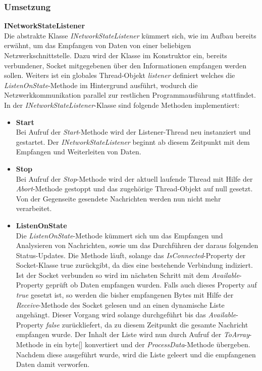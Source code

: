 \subsubsection{Umsetzung}
\textbf{INetworkStateListener}\\
Die abstrakte Klasse \textit{INetworkStateListener} kümmert sich, wie im Aufbau bereits erwähnt, um das Empfangen von Daten von einer beliebigen Netzwerkschnittstelle. Dazu wird der Klasse im Konstruktor ein, bereits verbundener, Socket mitgegebenen über den Informationen empfangen werden sollen. Weiters ist ein globales Thread-Objekt \textit{listener} definiert welches die \textit{ListenOnState}-Methode im Hintergrund ausführt, wodurch die Netzwerkkommunikation parallel zur restlichen Programmausführung stattfindet.\\
In der \textit{INetworkStateListener}-Klasse sind folgende Methoden implementiert:
\begin{itemize}
\item \textbf{Start}\\
Bei Aufruf der \textit{Start}-Methode wird der Listener-Thread neu instanziert und gestartet. Der  \textit{INetworkStateListener} beginnt ab diesem Zeitpunkt mit dem Empfangen und Weiterleiten von Daten. 
\item \textbf{Stop}\\
Bei Aufruf der \textit{Stop}-Methode wird der aktuell laufende Thread mit Hilfe der  \textit{Abort}-Methode gestoppt und das zugehörige Thread-Objekt auf null gesetzt. Von der Gegenseite gesendete Nachrichten werden nun nicht mehr verarbeitet.
\item \textbf{ListenOnState}\\
Die \textit{ListenOnState}-Methode kümmert sich um das Empfangen und Analysieren von Nachrichten, sowie um das Durchführen der daraus folgenden Status-Updates. 
Die Methode läuft, solange das \textit{IsConnected}-Property der Socket-Klasse true zurückgibt, da dies eine bestehende Verbindung indiziert. Ist der Socket verbunden so wird im nächsten Schritt mit dem \textit{Available}-Property geprüft ob Daten empfangen wurden. Falls auch dieses Property auf \textit{true} gesetzt ist, so werden die bisher empfangenen Bytes mit Hilfe der \textit{Receive}-Methode des Socket gelesen und an einen dynamische Liste angehängt. 
Dieser Vorgang wird solange durchgeführt bis das \textit{Available}-Property \textit{false} zurückliefert, da zu diesem Zeitpunkt die gesamte Nachricht empfangen wurde. Der Inhalt der Liste wird nun durch Aufruf der  \textit{ToArray}-Methode in ein byte[] konvertiert und der \textit{ProcessData}-Methode übergeben. Nachdem diese ausgeführt wurde, wird die Liste geleert und die empfangenen Daten damit verworfen.
\end{itemize}
